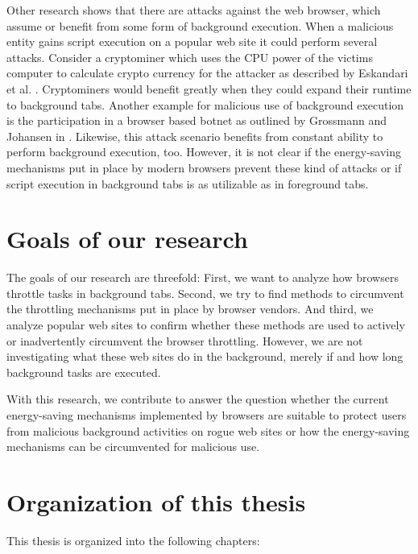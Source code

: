 \documentclass[
	ruledheaders=section,%
	class=report,%
	thesis={type=bachelor},%
	accentcolor=9c,%
	custommargins=true,%
	marginpar=false,%
	parskip=half-,%
	fontsize=11pt,%
]{tudapub}
\begin{document}
Other research shows that there are attacks against the web browser, which assume or benefit from some form of background execution. When a malicious entity gains script execution on a popular web site it could perform several attacks. Consider a cryptominer which uses the CPU power of the victims computer to calculate crypto currency for the attacker as described by Eskandari et al. \cite{eskandari2018first}. Cryptominers would benefit greatly when they could expand their runtime to background tabs. Another example for malicious use of background execution is the participation in a browser based botnet as outlined by Grossmann and Johansen in \cite{grossmann2013million}. Likewise, this attack scenario benefits from constant ability to perform background execution, too. However, it is not clear if the energy-saving mechanisms put in place by modern browsers prevent these kind of attacks or if script execution in background tabs is as utilizable as in foreground tabs.

  \section{Goals of our research}

  The goals of our research are threefold: First, we want to analyze how browsers throttle tasks in background tabs. Second, we try to find methods to circumvent the throttling mechanisms put in place by browser vendors. And third, we analyze popular web sites to confirm whether these methods are used to actively or inadvertently circumvent the browser throttling. However, we are not investigating what these web sites do in the background, merely if and how long background tasks are executed.

  With this research, we contribute to answer the question whether the current energy-saving mechanisms implemented by browsers are suitable to protect users from malicious background activities on rogue web sites or how the energy-saving mechanisms can be circumvented for malicious use.

  \section{Organization of this thesis}

  This thesis is organized into the following chapters:
\end{document}
